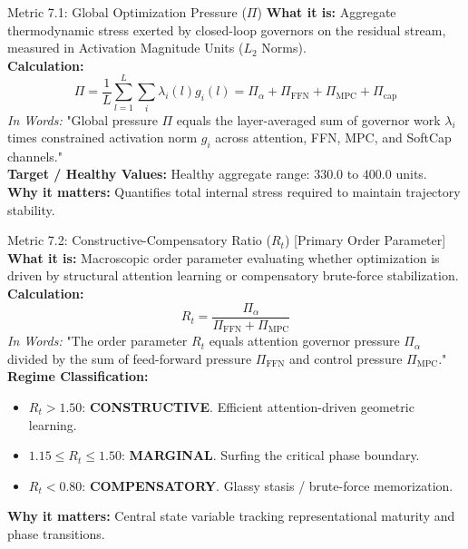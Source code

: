 \documentclass[10pt,a4paper]{article}
\begin{document}
\begin{metricbox}{Metric 7.1: Global Optimization Pressure ($\Pi$)}
\textbf{What it is:} Aggregate thermodynamic stress exerted by closed-loop governors on the residual stream, measured in Activation Magnitude Units ($L_2$ Norms).\\
\textbf{Calculation:}
$$\Pi = \frac{1}{L} \sum_{l=1}^L \sum_i \lambda_i(l) g_i(l) = \Pi_\alpha + \Pi_{\text{FFN}} + \Pi_{\text{MPC}} + \Pi_{\text{cap}}$$
\emph{In Words:} "Global pressure $\Pi$ equals the layer-averaged sum of governor work $\lambda_i$ times constrained activation norm $g_i$ across attention, FFN, MPC, and SoftCap channels."\\
\textbf{Target / Healthy Values:} Healthy aggregate range: $330.0$ to $400.0$ units.\\
\textbf{Why it matters:} Quantifies total internal stress required to maintain trajectory stability.
\end{metricbox}

\begin{metricbox}{Metric 7.2: Constructive-Compensatory Ratio ($R_t$) [Primary Order Parameter]}
\textbf{What it is:} Macroscopic order parameter evaluating whether optimization is driven by structural attention learning or compensatory brute-force stabilization.\\
\textbf{Calculation:}
$$R_t = \frac{\Pi_\alpha}{\Pi_{\text{FFN}} + \Pi_{\text{MPC}}}$$
\emph{In Words:} "The order parameter $R_t$ equals attention governor pressure $\Pi_\alpha$ divided by the sum of feed-forward pressure $\Pi_{\text{FFN}}$ and control pressure $\Pi_{\text{MPC}}$."\\
\textbf{Regime Classification:}
\begin{itemize}
    \item $R_t > 1.50$: \textbf{CONSTRUCTIVE}. Efficient attention-driven geometric learning.
    \item $1.15 \le R_t \le 1.50$: \textbf{MARGINAL}. Surfing the critical phase boundary.
    \item $R_t < 0.80$: \textbf{COMPENSATORY}. Glassy stasis / brute-force memorization.
\end{itemize}
\textbf{Why it matters:} Central state variable tracking representational maturity and phase transitions.
\end{metricbox}
\end{document}
